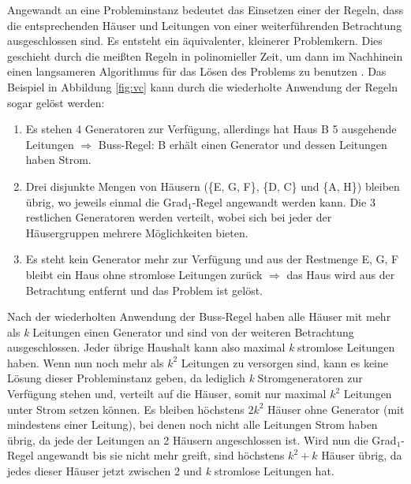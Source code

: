 Angewandt an eine Probleminstanz bedeutet das Einsetzen einer der Regeln, dass die entsprechenden Häuser und Leitungen von einer weiterführenden Betrachtung ausgeschlossen sind. Es entsteht ein äquivalenter, kleinerer Problemkern. Dies geschieht durch die meißten Regeln in polinomieller Zeit, um dann im Nachhinein einen langsameren Algorithmus für das Lösen des Problems zu benutzen \cite{param}. Das Beispiel in Abbildung \ref{fig:vc} kann durch die wiederholte Anwendung der Regeln sogar gelöst werden:
\begin{enumerate}
\item Es stehen 4 Generatoren zur Verfügung, allerdings hat Haus B 5 ausgehende Leitungen $\Rightarrow$ Buss-Regel: B erhält einen Generator und dessen Leitungen haben Strom.
\item Drei disjunkte Mengen von Häusern (\{E, G, F\}, \{D, C\} und \{A, H\}) bleiben übrig, wo jeweils einmal die Grad$_{1}$-Regel angewandt werden kann. Die 3 restlichen Generatoren werden verteilt, wobei sich bei jeder der Häusergruppen mehrere Möglichkeiten bieten.
\item Es steht kein Generator mehr zur Verfügung und aus der Restmenge {E, G, F} bleibt ein Haus ohne stromlose Leitungen zurück $\Rightarrow$ das Haus wird aus der Betrachtung entfernt und das Problem ist gelöst.
\end{enumerate}
Nach der wiederholten Anwendung der Buss-Regel haben alle Häuser mit mehr als \emph{k} Leitungen einen Generator und sind von der weiteren Betrachtung ausgeschlossen. Jeder übrige Haushalt kann also maximal \emph{k} stromlose Leitungen haben. Wenn nun noch mehr als $k^{2}$ Leitungen zu versorgen sind, kann es keine Lösung dieser Probleminstanz geben, da lediglich \emph{k} Stromgeneratoren zur Verfügung stehen und, verteilt auf die Häuser, somit nur maximal $k^{2}$ Leitungen unter Strom setzen können. Es bleiben höchstens $2 k^{2}$ Häuser ohne Generator (mit mindestens einer Leitung), bei denen noch nicht alle Leitungen Strom haben übrig\cite{param}, da jede der Leitungen an 2 Häusern angeschlossen ist. Wird nun die Grad$_{1}$-Regel angewandt bis sie nicht mehr greift, sind höchstens $k^{2} + k$ Häuser übrig, da jedes dieser Häuser jetzt zwischen 2 und \emph{k} stromlose Leitungen hat.


